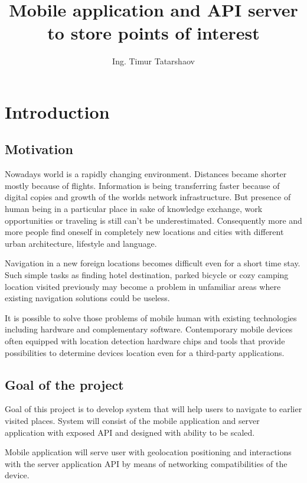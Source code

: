 \documentclass[thesis=M,english]{FITthesis}[2012/10/20]
\title{Mobile application and API server to store points of interest}
\author{Ing. Timur Tatarshaov} %
\begin{document}



\chapter{Introduction}

\section{Motivation}

Nowadays world is a rapidly changing environment. Distances became shorter mostly because of flights. Information is being transferring faster because of digital copies and growth of the worlds network infrastructure. But presence of human being in a particular place in sake of knowledge exchange, work opportunities or traveling is still can't be underestimated. Consequently more and more people find oneself in completely new locations and cities with different urban architecture, lifestyle and language. 

Navigation in a new foreign locations becomes difficult even for a short time stay. Such simple tasks as finding hotel destination, parked bicycle or cozy camping location visited previously may become a problem in unfamiliar areas where existing navigation solutions could be useless.

It is possible to solve those problems of mobile human with existing technologies including hardware and complementary software. Contemporary mobile devices often equipped with location detection hardware chips and tools that provide possibilities to determine devices location even for a third-party applications.



\section{Goal of the project}

Goal of this project is to develop system that will help users to navigate to earlier visited places. System will consist of the mobile application and server application with exposed API and designed with ability to be scaled.

Mobile application will serve user with geolocation positioning and interactions with the server application API by means of networking compatibilities of the device.
\end{document}
